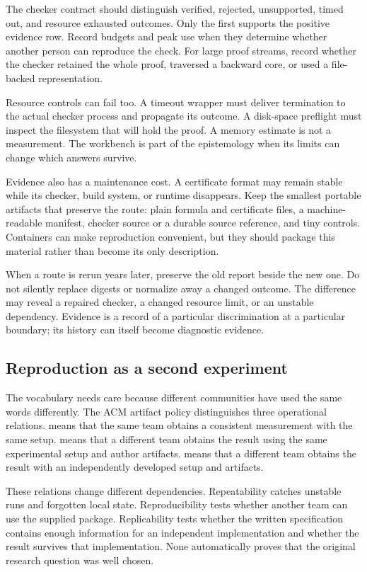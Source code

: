 The checker contract should distinguish verified, rejected, unsupported,
timed out, and resource exhausted outcomes. Only the first supports the
positive evidence row. Record budgets and peak use when they determine whether
another person can reproduce the check. For large proof streams, record
whether the checker retained the whole proof, traversed a backward core, or
used a file-backed representation.

Resource controls can fail too. A timeout wrapper must deliver termination to
the actual checker process and propagate its outcome. A disk-space preflight
must inspect the filesystem that will hold the proof. A memory estimate is not
a measurement. The workbench is part of the epistemology when its limits can
change which answers survive.

Evidence also has a maintenance cost. A certificate format may remain stable
while its checker, build system, or runtime disappears. Keep the smallest
portable artifacts that preserve the route: plain formula and certificate
files, a machine-readable manifest, checker source or a durable source
reference, and tiny controls. Containers can make reproduction convenient,
but they should package this material rather than become its only description.

When a route is rerun years later, preserve the old report beside the new one.
Do not silently replace digests or normalize away a changed outcome. The
difference may reveal a repaired checker, a changed resource limit, or an
unstable dependency. Evidence is a record of a particular discrimination at a
particular boundary; its history can itself become diagnostic evidence.

\subsection{Reproduction as a second experiment}

The vocabulary needs care because different communities have used the same
words differently. The ACM artifact policy distinguishes three operational
relations.  means that the same team obtains a
consistent measurement with the same setup.  means
that a different team obtains the result using the same experimental setup
and author artifacts.  means that a different team
obtains the result with an independently developed setup and artifacts.
\autocite{acm2020artifactbadging}

These relations change different dependencies. Repeatability catches unstable
runs and forgotten local state. Reproducibility tests whether another team can
use the supplied package. Replicability tests whether the written specification
contains enough information for an independent implementation and whether the
result survives that implementation. None automatically proves that the
original research question was well chosen.

